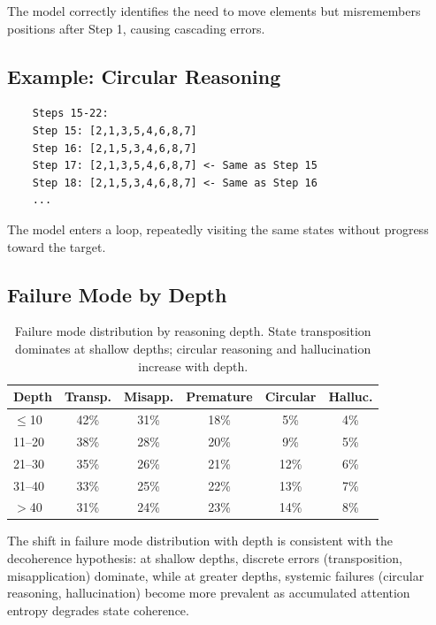 \documentclass{article}
\theoremstyle{plain}
\theoremstyle{definition}
\theoremstyle{remark}
\begin{document}
The model correctly identifies the need to move elements but misremembers positions after Step 1, causing cascading errors.

\subsection{Example: Circular Reasoning}

\begin{verbatim}
	Steps 15-22:
	Step 15: [2,1,3,5,4,6,8,7]
	Step 16: [2,1,5,3,4,6,8,7]
	Step 17: [2,1,3,5,4,6,8,7] <- Same as Step 15
	Step 18: [2,1,5,3,4,6,8,7] <- Same as Step 16
	...
\end{verbatim}

The model enters a loop, repeatedly visiting the same states without progress toward the target.

\subsection{Failure Mode by Depth}

\begin{table}[h]
	\centering
	\caption{Failure mode distribution by reasoning depth. State transposition dominates at shallow depths; circular reasoning and hallucination increase with depth.}
	\label{tab:failure_by_depth}
	\small
	\begin{tabular}{@{}lccccc@{}}
		\toprule
		\textbf{Depth} & \textbf{Transp.} & \textbf{Misapp.} & \textbf{Premature} & \textbf{Circular} & \textbf{Halluc.} \\
		\midrule
		$\leq$10 & 42\% & 31\% & 18\% & 5\% & 4\% \\
		11--20 & 38\% & 28\% & 20\% & 9\% & 5\% \\
		21--30 & 35\% & 26\% & 21\% & 12\% & 6\% \\
		31--40 & 33\% & 25\% & 22\% & 13\% & 7\% \\
		$>$40 & 31\% & 24\% & 23\% & 14\% & 8\% \\
		\bottomrule
	\end{tabular}
\end{table}

The shift in failure mode distribution with depth is consistent with the decoherence hypothesis: at shallow depths, discrete errors (transposition, misapplication) dominate, while at greater depths, systemic failures (circular reasoning, hallucination) become more prevalent as accumulated attention entropy degrades state coherence.
\end{document}
